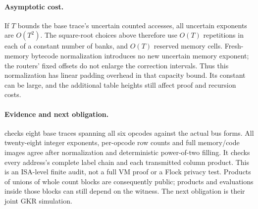 \documentclass[11pt]{article}
\begin{document}
\paragraph{Asymptotic cost.} If $T$ bounds the base trace's uncertain counted accesses, all uncertain exponents are $O(T^2)$. The square-root choices above therefore use $O(T)$ repetitions in each of a constant number of banks, and $O(T)$ reserved memory cells. Fresh-memory bytecode normalization introduces no new uncertain memory exponent; the routers' fixed offsets do not enlarge the correction intervals. Thus this normalization has linear padding overhead in that capacity bound. Its constant can be large, and the additional table heights still affect proof and recursion costs.

\paragraph{Evidence and next obligation.}  checks eight base traces spanning all six opcodes against the actual bus forms. All twenty-eight integer exponents, per-opcode row counts and full memory/code images agree after normalization and deterministic power-of-two filling. It checks every address's complete label chain and each transmitted column product. This is an ISA-level finite audit, not a full VM proof or a Flock privacy test. Products of unions of whole count blocks are consequently public; products and evaluations inside those blocks can still depend on the witness. The next obligation is their joint GKR simulation.
\end{document}
